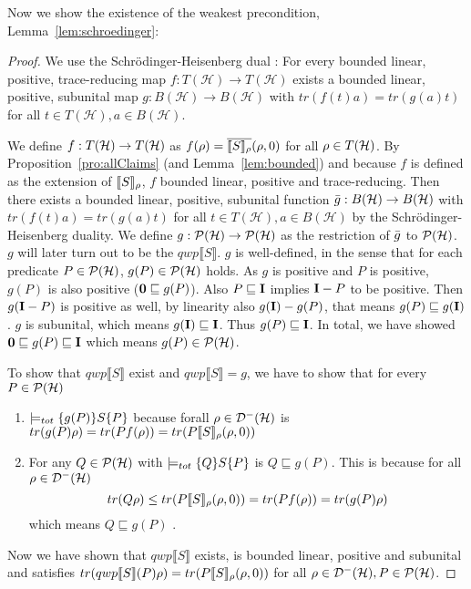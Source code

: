 \documentclass[a4paper,UKenglish,cleveref, autoref, thm-restate]{lipics-v2021}
\begin{document}
Now we show the existence of the weakest precondition, Lemma~\ref{lem:schroedinger}:
\begin{proof}
    We use the Schrödinger-Heisenberg dual \cite[Lemma 35 (ii),(iii),(vi)]{heisenbergdualityUnruh}:
    For every bounded linear, positive, trace-reducing map $f: T(\mathcal{H}) \rightarrow T( \mathcal{H})$ exists a bounded linear, positive, subunital map $g: B(\mathcal{H}) \rightarrow B(\mathcal{H})$ with $tr(f(t)a) = tr(g(a) t)$ for all $t\in T(\mathcal{H}), a \in B(\mathcal{H})$.

    We define $f:T(\mathcal{H}) \to T(\mathcal{H})$ as $f(\rho) = \overline{\llbracket S \rrbracket_{\rho}}(\rho,0)$ for all $\rho\in T(\mathcal{H})$. By Proposition~\ref{pro:allClaims} (and Lemma~\ref{lem:bounded}) and because $f$ is defined as the extension of $\llbracket S \rrbracket_{\rho}$, $f$ bounded linear, positive and trace-reducing.
    Then there exists a bounded linear, positive, subunital function $\Bar{g}:B(\mathcal{H}) \to B(\mathcal{H})$ with $tr(f(t)a) = tr(g(a) t)$ for all $t\in T(\mathcal{H}), a \in B(\mathcal{H})$ by the Schrödinger-Heisenberg duality.
    We define $g:\mathcal{P}(\mathcal{H}) \to \mathcal{P}(\mathcal{H})$ as the restriction of $\Bar{g}$ to $\mathcal{P}(\mathcal{H})$. $g$ will later turn out to be the $qwp\llbracket S \rrbracket$. $g$ is well-defined, in the sense that for each predicate $P \in \mathcal{P}(\mathcal{H})$, $g(P) \in \mathcal{P}(\mathcal{H})$ holds. As $g$ is positive and $P$ is positive, $g(P)$ is also positive ($\mathbf{0} \sqsubseteq g(P)$). Also $P\sqsubseteq \textbf{I}$ implies $\textbf{I} - P$ to be positive. Then $g(\textbf{I}-P)$ is positive as well, by linearity also $g(\textbf{I})- g(P)$, that means $g(P) \sqsubseteq g(\textbf{I})$. $g$ is subunital, which means $g(\textbf{I}) \sqsubseteq \textbf{I}$. Thus $ g(P) \sqsubseteq \textbf{I}$. In total, we have showed $\mathbf{0} \sqsubseteq g(P) \sqsubseteq \textbf{I}$ which means $g(P)\in \mathcal{P}(\mathcal{H})$.

    To show that $qwp\llbracket S \rrbracket$ exist and $qwp\llbracket S \rrbracket = g$, we have to show that for every $P\in \mathcal{P}(\mathcal{H})$
    \begin{enumerate}
        \item $\models_{tot}\{g(P)\} S \{P\}$ because forall $\rho\in \mathcal{D}^- (\mathcal{H})$ is $tr(g(P)\rho) = tr(P f(\rho)) = tr(P \llbracket S \rrbracket_{\rho}(\rho,0))$
        \item For any $Q\in \mathcal{P}(\mathcal{H})$ with $\models_{tot}\{Q\} S \{P\}$ is $Q\sqsubseteq g(P)$. This is because for all $\rho \in \mathcal{D}^- (\mathcal{H})$ \begin{equation*}
            tr(Q\rho) \leq tr(P\llbracket S \rrbracket_{\rho}(\rho,0)) = tr(P f(\rho)) = tr(g(P)\rho)
        \end{equation*}
        which means $Q\sqsubseteq g(P)$ \cite{floydHoareLogic}.
    \end{enumerate}
    Now we have shown that $qwp\llbracket S \rrbracket$ exists, is bounded linear, positive and subunital and satisfies $tr(qwp\llbracket S \rrbracket (P)\rho) = tr(P \llbracket S \rrbracket_{\rho}(\rho,0))$ for all $\rho \in \mathcal{D}^- (\mathcal{H}), P \in \mathcal{P}(\mathcal{H})$.



\end{proof}
\end{document}
